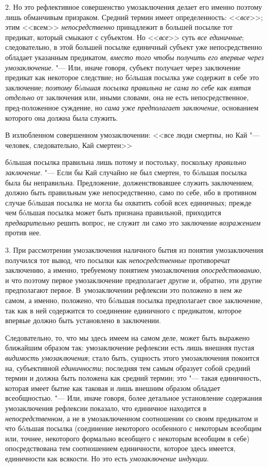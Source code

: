 2. Но это рефлективное совершенство умозаключения делает его
именно поэтому лишь обманчивым призраком. Средний термин имеет
определенность: <<{\em все}>>;
этим <<всем>>
{\em непосредственно}
принадлежит в большей посылке тот предикат, который смыкают с
субъектом. Но <<{\em все}>>
суть {\em все единичные};
следовательно, в этой большей посылке единичный субъект уже
непосредственно обладает указанным предикатом,
{\em вместо того чтобы получить его
впервые через умозаключение}. "--- Или, иначе говоря, субъект
получает через заключение предикат как некоторое следствие; но бóльшая
посылка уже содержит в себе это заключение;
{\em поэтому
б}ó{\em льшая посылка правильна не сама
по себе как взятая отдельно} от заключения или, иными
словами, она не есть непосредственное, пред-положенное суждение, но
{\em сама уже предполагает заключение},
основанием которого она должна была служить.

В излюбленном совершенном умозаключении:
<<все люди смертны,
но Кай "--- человек,
следовательно, Кай смертен>>

бóльшая посылка правильна лишь потому и постольку, поскольку
{\em правильно заключение}. "---
Если бы Кай случайно не был смертен, то бóльшая посылка была
бы неправильна. Предложение, долженствовавшее служить заключением, должно
быть правильным уже непосредственно, само по себе, ибо в противном случае
бóльшая посылка не могла бы охватить собой всех единичных; прежде чем
бóльшая посылка может быть признана правильной, приходится
{\em предварительно}
решить вопрос, не служит ли само это заключение
{\em возражением} против
нее.

3. При рассмотрении умозаключения наличного бытия из понятия
умозаключения получился тот вывод, что посылки как
{\em непосредственные}
противоречат заключению, а именно, требуемому понятием
умозаключения {\em опосредствованию},
и что поэтому первое умозаключение предполагает другие и,
обратно, эти другие предполагают первое. В~умозаключении рефлексии это
положено в нем же самом, а именно, положено, что бóльшая
посылка предполагает свое заключение, так как в ней содержится то
соединение единичного с предикатом, которое впервые должно быть установлено
в заключении.

Следовательно, то, что мы здесь имеем на самом деле, может
быть выражено ближайшим образом так: умозаключение рефлексии есть лишь
внешняя пустая {\em видимость
умозаключения}; стало быть, сущность этого умозаключения
покоится на, субъективной
{\em единичности};
последняя тем самым образует собой средний термин и должна
быть положена как средний термин; это "--- такая единичность,
которая имеет бытие как таковая и лишь внешним образом обладает
всеобщностью. "--- Или, иначе говоря, более детальное
установление содержания умозаключения рефлексии показало, что единичное
находится в {\em непосредственном},
а не в умозаключенном соотношении со своим предикатом и что
бóльшая посылка (соединение некоторого особенного с некоторым всеобщим или,
точнее, некоторого формально всеобщего с некоторым всеобщим в себе)
опосредствована тем соотношением единичности, которое здесь имеется,
единичности как всякости. Но это есть
{\em умозаключение индукции}.


